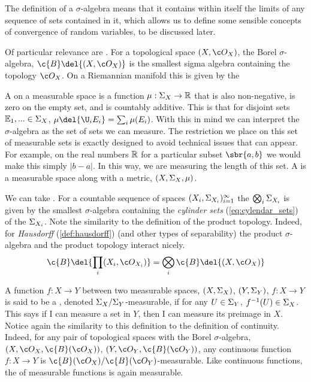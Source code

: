 The definition of a \(\sigma\)-algebra means that it contains within itself the limits of any sequence of sets contained in it, which allows us to define some sensible concepts of convergence of random variables, to be discussed later.

Of particular relevance are .
For a topological space \((X, \topo{X})\), the Borel \(\sigma\)-algebra, \(\c{B}\del{(X, \topo{X})}\) is the smallest sigma algebra containing the topology \(\topo{X}\).
On a Riemannian manifold this is given by the 

A  on a measurable space is a function \(\mu: \Sigma_{X} \to \mathbb{R}\) that is also non-negative, is zero on the empty set, and is countably additive.
This is that for disjoint sets \(\operatorname{\mathbb{E}}_1,...  \in \Sigma_{X}\), \(\mu\del{\U_i E_i} = \sum_i  \mu(E_i)\).
With this in mind we can interpret the \(\sigma\)-algebra as the set of sets we can measure.
The restriction we place on this set of measurable sets is exactly designed to avoid technical issues that can appear.
For example, on the real numbers \(\mathbb{R}\) for a particular subset \(\sbr{a,b}\) we would make this simply \(|b-a|\).
In this way, we are measuring the length of this set.
A  is a measurable space along with a metric, \((X, \Sigma_{X}, \mu)\).

We can take .
For a countable sequence of spaces \((X_i, \Sigma_{X_i})_{i=1}^\infty\) the  \(\bigotimes_i \Sigma_{X_i}\) is given by the smallest \(\sigma\)-algebra containing the \emph{cylinder sets} (\cref{eq:cylendar_sets}) of the \(\Sigma_{X_i}\).
Note the similarity to the definition of the product topology.
Indeed, for \emph{Hausdorff} (\cref{def:hausdorff}) (and other types of separability) the product \(\sigma\)-algebra and the product topology interact nicely.
\[
	\c{B}\del{\prod_i (X_i, \topo{X_i})} = \bigotimes_i \c{B}\del{(X, \topo{X})}
\]

A function \(f: X\to Y\) between two measurable spaces, \((X, \Sigma_{X})\), \((Y, \Sigma_{Y})\), \(f:X \to Y\) is said to be a , denoted \(\Sigma_{X}/\Sigma_{Y}\)-measurable, if for any \(U \in \Sigma_{{Y}}\), \(f^{-1}(U)\in \Sigma_{X}\).
This says if I can measure a set in \(Y\), then I can measure its preimage in \(X\). Notice again the similarity to this definition to the definition of continuity. Indeed, for any pair of topological spaces with the Borel \(\sigma\)-algebra, \((X, \topo{X}, \c{B}(\topo{X}))\), \((Y, \topo{Y}, \c{B}(\topo{Y}))\), any continuous function \(f:X\to Y\) is \(\c{B}(\topo{X})/\c{B}(\topo{Y})\)-measurable. Like continuous functions, the  of measurable functions is again measurable.

